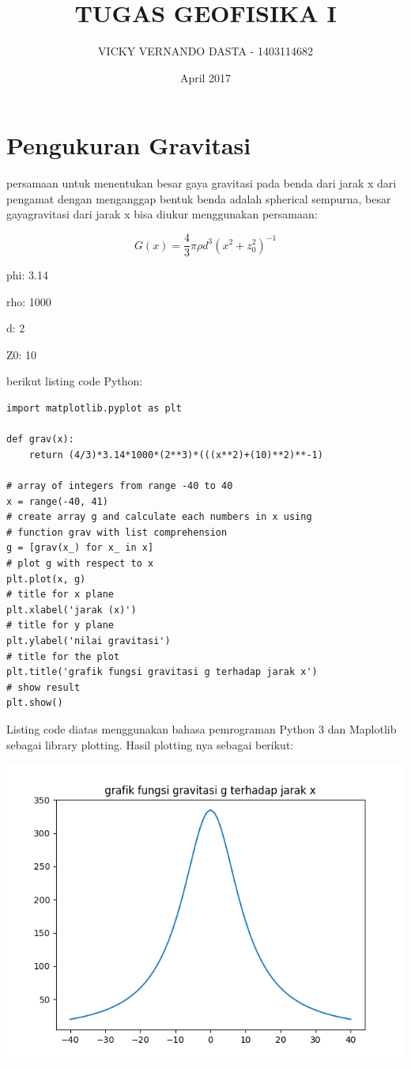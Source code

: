 \documentclass{article}
\title{TUGAS GEOFISIKA I}
\author{VICKY VERNANDO DASTA - 1403114682}
\date{April 2017}
\begin{document}
\maketitle

\section{Pengukuran Gravitasi}

persamaan untuk menentukan besar gaya gravitasi pada benda dari jarak x dari pengamat 
dengan menganggap bentuk benda adalah spherical sempurna, besar gayagravitasi dari jarak x bisa diukur menggunakan persamaan:


$$G(x)=\frac{4}{3}{\pi}{\rho}{d^{3}}{(x^{2} + z_{0}^{2})^{-1}} $$


phi: 3.14

rho: 1000 

d: 2

Z0: 10


berikut listing code Python:

\begin{lstlisting}
import matplotlib.pyplot as plt

def grav(x):
    return (4/3)*3.14*1000*(2**3)*(((x**2)+(10)**2)**-1)

# array of integers from range -40 to 40
x = range(-40, 41)
# create array g and calculate each numbers in x using 
# function grav with list comprehension
g = [grav(x_) for x_ in x]
# plot g with respect to x
plt.plot(x, g)
# title for x plane
plt.xlabel('jarak (x)')
# title for y plane
plt.ylabel('nilai gravitasi')
# title for the plot
plt.title('grafik fungsi gravitasi g terhadap jarak x')
# show result
plt.show()
\end{lstlisting}



Listing code diatas menggunakan bahasa pemrograman Python 3 dan Maplotlib sebagai library plotting. Hasil plotting nya sebagai berikut:

\includegraphics{plotgeo.png}
\end{document}
